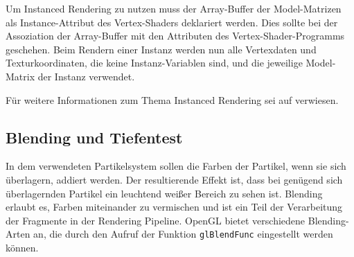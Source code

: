 Um Instanced Rendering zu nutzen muss der Array-Buffer der Model-Matrizen als Instance-Attribut des Vertex-Shaders deklariert werden. Dies sollte bei der Assoziation der Array-Buffer mit den Attributen des Vertex-Shader-Programms geschehen.
Beim Rendern einer Instanz werden nun alle Vertexdaten und Texturkoordinaten, die keine Instanz-Variablen sind, und die jeweilige Model-Matrix der Instanz verwendet.

Für weitere Informationen zum Thema Instanced Rendering sei auf \cite{ksls:2013} verwiesen.

\subsection{Blending und Tiefentest}
\label{Kapitel_2_-_Unterkapitel_2.3}
%
In dem verwendeten Partikelsystem sollen die Farben der Partikel, wenn sie sich überlagern, addiert werden. Der resultierende Effekt ist, dass bei genügend sich überlagernden Partikel ein leuchtend weißer Bereich zu sehen ist. Blending erlaubt es, Farben miteinander zu vermischen und ist ein Teil der Verarbeitung der Fragmente in der Rendering Pipeline. OpenGL bietet verschiedene Blending-Arten an, die durch den Aufruf der Funktion {\texttt{glBlendFunc}} eingestellt werden können. 

